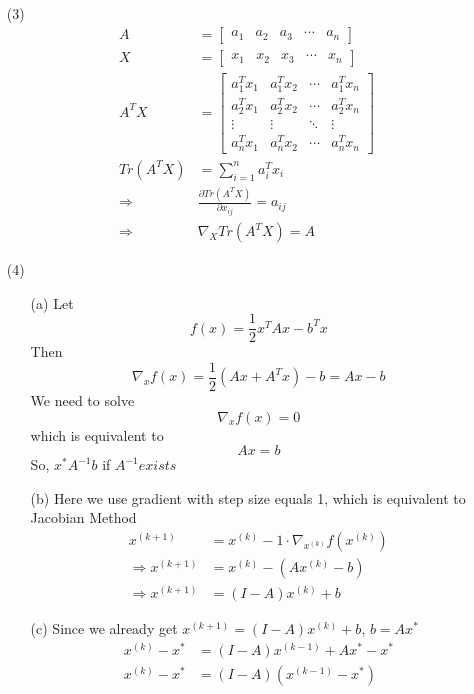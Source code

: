 \documentclass[a4paper,12pt]{article}
\begin{document}
\begin{enumerate}
\begin{itemize}
\clearpage
\item[(3)]
\begin{align*}
A &= 
\left [ 
\begin{array}{ccccc}
a_1 & a_2 & a_3& \cdots &a_n
\end{array} 
\right ] \\
X &= 
\left [ 
\begin{array}{ccccc}
x_1 & x_2 & x_3& \cdots &x_n
\end{array} 
\right ] \\
A^T X &= 
\left [ 
\begin{array}{cccc}
a_1^T x_1 & a_1^T x_2 & \cdots &a_1^T x_n \\
a_2^T x_1 & a_2^T x_2 & \cdots &a_2^T x_n \\
\vdots & \vdots & \ddots & \vdots \\
a_n^T x_1 & a_n^T x_2 & \cdots &a_n^T x_n 
\end{array} 
\right ] \\
Tr(A^T X) &= \sum_{i=1}^n a_i^T x_i \\
\Longrightarrow & \frac{\partial Tr(A^T X)}{\partial x_{ij}} = a_{ij}\\
\Longrightarrow & \nabla_X Tr(A^T X) = A
\end{align*}

\clearpage
\item[(4)]
\begin{itemize}
\item[(a)]
Let
$$
f(x) = \frac{1}{2} x^T A x - b^T x
$$
Then
$$
\nabla_x f(x) = \frac{1}{2} \left( A x + A^T x\right) - b = Ax - b
$$
We need to solve
$$
\nabla_x f(x) = 0
$$
which is equivalent to 
$$
Ax = b
$$
So, $x^* A^{-1} b$ if $A^{-1} exists$

\item[(b)] 
Here we use gradient with step size equals 1, which is equivalent to Jacobian Method
\begin{align*}
x^{(k+1)} &= x^{(k)} - 1 \cdot \nabla_{x^{(k)}} f(x^{(k)}) \\
\Longrightarrow x^{(k+1)} &= x^{(k)} - (A x^{(k)} - b) \\
\Longrightarrow x^{(k+1)} &= (I - A) x^{(k)} + b
\end{align*}

\item[(c)]
Since we already get $x^{(k+1)} = (I - A) x^{(k)} + b$, $b = A x^*$ 
\begin{align*}
x^{(k)} - x^* &= (I - A) x^{(k-1)} + A x^* - x^*\\
x^{(k)} - x^* &= (I - A) \left ( x^{(k-1)} - x^* \right )
\end{align*}


\end{itemize}
\end{itemize}
\end{enumerate}
\end{document}
